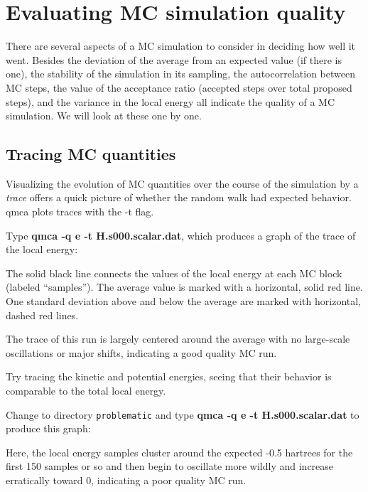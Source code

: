 \section{Evaluating MC simulation quality}

There are several aspects of a MC simulation to consider in deciding how well
it went.  Besides the deviation of the average from an expected value (if there
is one), the stability of the simulation in its sampling, the autocorrelation
between MC steps, the value of the acceptance ratio (accepted steps over total
proposed steps), and the variance in the local energy all indicate the quality
of a MC simulation.  We will look at these one by one.

\subsection{Tracing MC quantities}

Visualizing the evolution of MC quantities over the course of the simulation by
a \textit{trace} offers a quick picture of whether the random walk had expected
behavior.  qmca plots traces with the -t flag.

Type \textbf{qmca -q e -t H.s000.scalar.dat}, which produces a graph of the
trace of the local energy:


The solid black line connects the values of the local energy at each MC block
(labeled ``samples'').  The average value is marked with a horizontal, solid
red line.  One standard deviation above and below the average are marked with
horizontal, dashed red lines.  

The trace of this run is largely centered around the average with no
large-scale oscillations or major shifts, indicating a good quality MC run. 

Try tracing the kinetic and potential energies, seeing that their behavior is
comparable to the total local energy.

Change to directory \texttt{problematic} and type \textbf{qmca -q e -t
H.s000.scalar.dat} to produce this graph:


Here, the local energy samples cluster around the expected -0.5 hartrees for the
first 150 samples or so and then begin to oscillate more wildly and increase
erratically toward 0, indicating a poor quality MC run.

